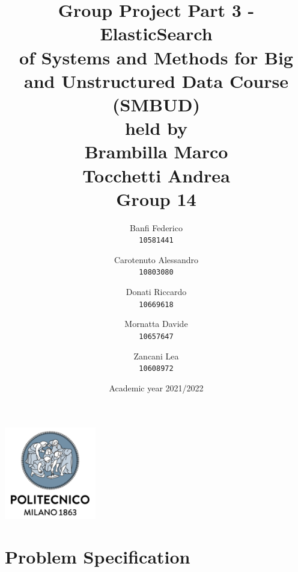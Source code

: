 \documentclass[a4paper,12pt]{article}
\begin{document}
\title{%
  Group Project Part 3 - ElasticSearch \\
  \large of Systems and Methods for Big
    and Unstructured Data Course \\(SMBUD)\\
    held by\\ Brambilla Marco\\ Tocchetti Andrea \\
  \vspace{5mm}
  \Large \textbf{Group 14}}
\author{Banfi Federico\\
  \texttt{10581441}
  \and
  Carotenuto Alessandro\\
  \texttt{10803080}
  \and
  Donati Riccardo\\
  \texttt{10669618}
  \and
  Mornatta Davide\\
  \texttt{10657647}
  \and
  Zancani Lea\\
  \texttt{10608972}}
\date{Academic year 2021/2022}
\maketitle
\begin{center}
  \includegraphics[width=4cm]{polilogo.png}\\
\end{center}
\newpage
\tableofcontents
\newpage
\section{Problem Specification}
\end{document}

